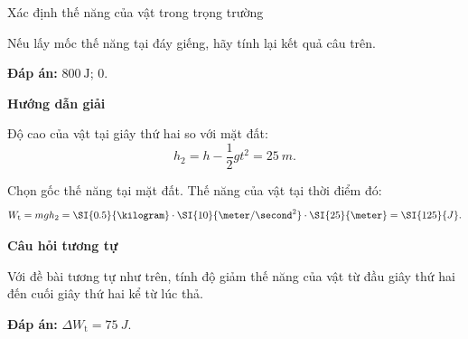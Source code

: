 \begin{dang}{Xác định thế năng của vật trong trọng trường}
{		Nếu lấy mốc thế năng tại đáy giếng, hãy tính lại kết quả câu trên.
		
		\textbf{Đáp án:} $\SI{800}{\joule}$; $0$.
	}
	{	\begin{center}
			\textbf{Hướng dẫn giải}
		\end{center}
		
		Độ cao của vật tại giây thứ hai so với mặt đất:
		$$h_2 = h - \dfrac{1}{2}gt^2 = \SI{25}{m}.$$
		
		Chọn gốc thế năng tại mặt đất. Thế năng của vật tại thời điểm đó:
		$$W_\text t = mgh_2 = \SI{0.5}{\kilogram}\cdot\SI{10}{\meter/\second^2}\cdot\SI{25}{\meter}=\SI{125}{J}.$$
		
		\begin{center}
			\textbf{Câu hỏi tương tự}
		\end{center}
		
		Với đề bài tương tự như trên, tính độ giảm thế năng của vật từ đầu giây thứ hai đến cuối giây thứ hai kể từ lúc thả.
		
		\textbf{Đáp án:} $\Delta W_\text{t} = \SI{75}{J}$.
	}
\end{dang}

